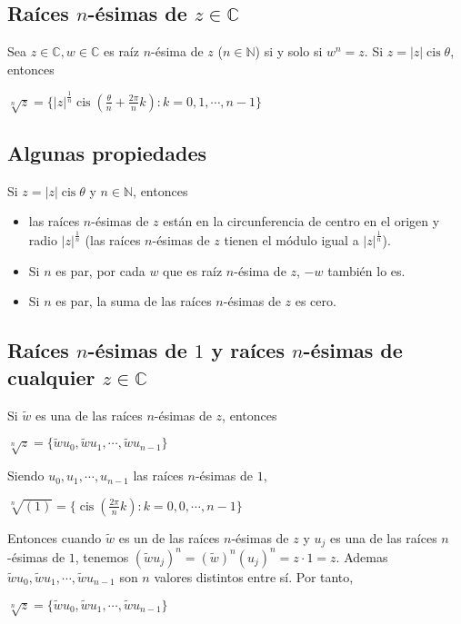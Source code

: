 \documentclass{article}
\DeclareMathOperator\cis{cis}
\begin{document}
 \subsection{Raíces $n$-ésimas de $z\in \mathbb{C}$}
 Sea $z\in \mathbb{C},w\in \mathbb{C}$ es raíz $n$-ésima de $z$ ($n\in \mathbb{N}$) si y solo si $w^n=z$. Si $z=|z|\cis{\theta}$, entonces
 \begin{center}
     $\sqrt[n]{z}=\{ |z|^{\frac{1}{n}}\cis{(\frac{\theta}{n}+\frac{2\pi}{n}k):k=0,1,\cdots ,n-1} \}$
 \end{center}
 
 \subsection{Algunas propiedades}
 Si $z=|z|\cis{\theta}$ y $n\in\mathbb{N}$, entonces
 \begin{itemize}
     \item las raíces $n$-ésimas de $z$ están en la circunferencia de centro en el origen y radio $|z|^{\frac{1}{n}}$ (las raíces $n$-ésimas de $z$ tienen el módulo igual a $|z|^{\frac{1}{n}}$).
     \item Si $n$ es par, por cada $w$ que es raíz $n$-ésima de $z$, $-w$ también lo es.
     \item Si $n$ es par, la suma de las raíces $n$-ésimas de $z$ es cero. %
 \end{itemize}
 
 \subsection{Raíces $n$-ésimas de $1$ y raíces $n$-ésimas de cualquier $z\in \mathbb{C}$}
 Si $\widetilde{w}$ es una de las raíces $n$-ésimas de $z$, entonces
 \begin{center}
     $\sqrt[n]{z}=\{ \widetilde{w}u_0,\widetilde{w}u_1,\cdots, \widetilde{w}u_{n-1}\}$
 \end{center}
 Siendo $u_0,u_1,\cdots,u_{n-1}$ las raíces $n$-ésimas de $1$,
 \begin{center}
     $\sqrt[n]{(1)}=\{ \cis{(\frac{2\pi}{n}k)}:k=0,0,\cdots,n-1 \}$
\end{center}

Entonces cuando $\widetilde{w}$ es un de las raíces $n$-ésimas de $z$ y $u_j$ es una de las raíces $n$-ésimas de $1$, tenemos $(\widetilde{w}u_j)^n=(\widetilde{w})^n(u_j)^n=z\cdot 1=z$. Ademas $\widetilde{w}u_0,\widetilde{w}u_1,\cdots ,\widetilde{w}u_{n-1}$ son $n$ valores distintos entre sí. Por tanto, 
\begin{center}
    $\sqrt[n]{z}=\{ \widetilde{w}u_0,\widetilde{w}u_1,\cdots ,\widetilde{w}u_{n-1} \}$
\end{center}
\end{document}
